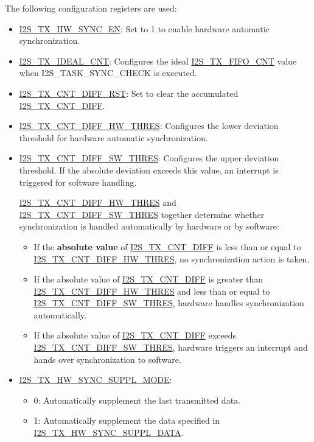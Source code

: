\documentclass[main\_\_EN.tex]{subfiles}
\begin{document}
The following configuration registers are used:

\begin{itemize}
    \item \hyperref[fielddesc:I2STXHWSYNCEN]{I2S\_TX\_HW\_SYNC\_EN}: Set to 1 to enable hardware automatic synchronization.
    \item \hyperref[fielddesc:I2STXIDEALCNT]{I2S\_TX\_IDEAL\_CNT}: Configures the ideal \hyperref[fielddesc:I2STXFIFOCNT]{I2S\_TX\_FIFO\_CNT} value when I2S\_TASK\_SYNC\_CHECK is executed.
    \item \hyperref[fielddesc:I2STXCNTDIFFRST]{I2S\_TX\_CNT\_DIFF\_RST}: Set to clear the accumulated \hyperref[fielddesc:I2STXCNTDIFF]{I2S\_TX\_CNT\_DIFF}.
    \item \hyperref[fielddesc:I2STXCNTDIFFHWTHRES]{I2S\_TX\_CNT\_DIFF\_HW\_THRES}: Configures the lower deviation threshold for hardware automatic synchronization.
    \item \hyperref[fielddesc:I2STXCNTDIFFSWTHRES]{I2S\_TX\_CNT\_DIFF\_SW\_THRES}: Configures the upper deviation threshold. If the absolute deviation exceeds this value, an interrupt is triggered for software handling.

\begin{tiplisting}
\hyperref[fielddesc:I2STXCNTDIFFHWTHRES]{I2S\_TX\_CNT\_DIFF\_HW\_THRES} and \hyperref[fielddesc:I2STXCNTDIFFSWTHRES]{I2S\_TX\_CNT\_DIFF\_SW\_THRES} together determine whether synchronization is handled automatically by hardware or by software:
    \begin{itemize}
        \item If the \textbf{absolute value} of \hyperref[fielddesc:I2STXCNTDIFF]{I2S\_TX\_CNT\_DIFF} is less than or equal to \hyperref[fielddesc:I2STXCNTDIFFHWTHRES]{I2S\_TX\_CNT\_DIFF\_HW\_THRES}, no synchronization action is taken.
        \item If the absolute value of \hyperref[fielddesc:I2STXCNTDIFF]{I2S\_TX\_CNT\_DIFF} is greater than \hyperref[fielddesc:I2STXCNTDIFFHWTHRES]{I2S\_TX\_CNT\_DIFF\_HW\_THRES} and less than or equal to \hyperref[fielddesc:I2STXCNTDIFFSWTHRES]{I2S\_TX\_CNT\_DIFF\_SW\_THRES}, hardware handles synchronization automatically.
        \item If the absolute value of \hyperref[fielddesc:I2STXCNTDIFF]{I2S\_TX\_CNT\_DIFF} exceeds \hyperref[fielddesc:I2STXCNTDIFFSWTHRES]{I2S\_TX\_CNT\_DIFF\_SW\_THRES}, hardware triggers an interrupt and hands over synchronization to software.
    \end{itemize}
\end{tiplisting}

    \item \hyperref[fielddesc:I2STXHWSYNCSUPPLMODE]{I2S\_TX\_HW\_SYNC\_SUPPL\_MODE}:
    \begin{itemize}
        \item 0: Automatically supplement the last transmitted data.
        \item 1: Automatically supplement the data specified in \hyperref[fielddesc:I2STXHWSYNCSUPPLDATA]{I2S\_TX\_HW\_SYNC\_SUPPL\_DATA}.
    \end{itemize}
\end{itemize}
\end{document}
